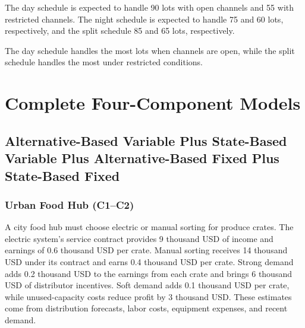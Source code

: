 	The day schedule is expected to handle 90 lots with open channels and 55 with restricted channels. The night schedule is expected to handle 75 and 60 lots, respectively, and the split schedule 85 and 65 lots, respectively.
	
	The day schedule handles the most lots when channels are open, while the split schedule handles the most under restricted conditions.

	
	\section{Complete Four-Component Models}
	\label{sec:complete-models}


\subsection{Alternative-Based Variable Plus State-Based Variable Plus Alternative-Based Fixed Plus State-Based Fixed}
	\label{sec:alternative-based-and-state-based-variable-payoffs-plus-alternative-based-and-state-based-fixed-payoffs}



	\subsubsection{Urban Food Hub (C1--C2)}
	\label{sec:problem34-urban-food-hub-c1-c2}
	
	A city food hub must choose electric or manual sorting for produce crates. The electric system’s service contract provides 9 thousand USD of income and earnings of 0.6 thousand USD per crate. Manual sorting receives 14 thousand USD under its contract and earns 0.4 thousand USD per crate. Strong demand adds 0.2 thousand USD to the earnings from each crate and brings 6 thousand USD of distributor incentives. Soft demand adds 0.1 thousand USD per crate, while unused-capacity costs reduce profit by 3 thousand USD. These estimates come from distribution forecasts, labor costs, equipment expenses, and recent demand.
	
